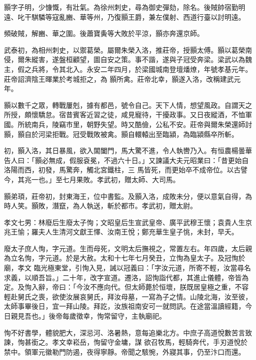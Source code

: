 \begin{pinyinscope}
 顥字子明，少慷慨，有壯氣。為徐州刺史，尋為御史彈劾，除名。後賊帥宿勤明遠、叱干騏驎等寇亂豳、華等州，乃復顥王爵，兼左僕射、西道行臺以討明遠。



 頻破賊，解豳、華之圍。後蕭寶夤等大敗於平涼，顥亦奔還京師。



 武泰初，為相州刺史，以禦葛榮。屬爾朱榮入洛，推莊帝，授顥太傅。顥以葛榮南侵，爾朱縱害，遂盤桓顧望，圖自安之策。事不諧，遂與子冠受奔梁。梁武以為魏主，假之兵將，令其北入。永安二年四月，於梁國城南登壇燔燎，年號孝基元年。莊帝詔濟陰王暉業於考城拒之，為
 顥所禽。莊帝北幸，顥遂入洛，改稱建武元年。



 顥以數千之眾，轉戰屢剋，據有都邑，號令自己。天下人情，想望風政。自謂天之所授，頗懷驕怠。宿昔賓客近習之徒，咸見寵待，干擾政事。又日夜縱酒，不恤軍國。所統南兵，陵竊市里，朝野失望。時又酷儉，公私不安。莊帝與爾朱榮還師討顥，顥自於河梁拒戰。冠受戰敗被禽。顥自轘轅出至臨潁，為臨潁縣卒所斬。



 初，顥入洛，其日暴風，欲入閶闔門，馬大驚不進，令人執轡乃入。有恒農楊曇華告人曰：「顥必無成，假服袞冕，不過六十日。」又諫議大夫元昭業曰：「昔更始自洛陽而西，初發，馬驚奔，觸北宮鐵柱，三
 馬皆死，而更始卒不成帝位。以古譬今，其兆一也。」至七月果敗。孝武初，贈太師、大司馬。



 顥弟頊，莊帝初，封東海王，位中書監。及顥入洛，成敗未分，便以意氣自得，為時人笑。顥敗，潛竄，為人執送，斬於都市。孝武初，贈太尉。



 孝文七男：林廢后生廢太子恂；文昭皇后生宣武皇帝、廣平武穆王懷；袁貴人生京兆王愉；羅夫人生清河文獻王懌、汝南王悅；鄭充華生皇子恌，未封，早夭。



 廢太子庶人恂，字元道。生而母死，文明太后撫視之，常置左右。年四歲，太后親為立名恂，字元道。於是大赦。太和十七年七月癸丑，立恂為皇太子。及冠恂於廟，孝文
 臨光極東堂，引恂入見，誡以冠義曰：「字汝元道，所寄不輕，汝當尋名求義，以順吾旨。」二十年，改字宣道。遷洛，詔恂詣代都，其進止儀體，帝皆為定。及恂入辭，帝曰：「今汝不應向代。但太師薨於恒壞，朕既居皇極之重，不容輕赴舅氏之喪，欲使汝展哀舅氏，拜汝母墓，一寫為子之情。山陵北海，汝至彼，太師事畢後日，宜一拜山陵。拜訖，汝族祖南安可一就問訊。在途當溫讀經籍，今日親見吾也。」後帝每歲徵幸，恂常留守，主執廟祀。



 恂不好書學，體貌肥大，深忌河、洛暑熱，意每追樂北方。中庶子高道悅數苦言致諫，恂甚銜之。孝文幸崧岳，恂留守金墉，謀
 欲召牧馬，輕騎奔代，手刃道悅於禁中。領軍元徽勒門防遏，夜得寧靜。帝聞之駭惋，外寢其事，仍至汴口而還。




\end{pinyinscope}
